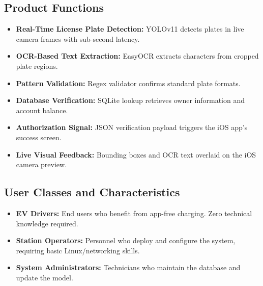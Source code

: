 \subsection{Product Functions}
\begin{itemize}
    \item \textbf{Real-Time License Plate Detection:} YOLOv11 detects plates in live camera frames with sub-second latency.
    \item \textbf{OCR-Based Text Extraction:} EasyOCR extracts characters from cropped plate regions.
    \item \textbf{Pattern Validation:} Regex validator confirms standard plate formats.
    \item \textbf{Database Verification:} SQLite lookup retrieves owner information and account balance.
    \item \textbf{Authorization Signal:} JSON verification payload triggers the iOS app's success screen.
    \item \textbf{Live Visual Feedback:} Bounding boxes and OCR text overlaid on the iOS camera preview.
\end{itemize}

\subsection{User Classes and Characteristics}
\begin{itemize}
    \item \textbf{EV Drivers:} End users who benefit from app-free charging. Zero technical knowledge required.
    \item \textbf{Station Operators:} Personnel who deploy and configure the system, requiring basic Linux/networking skills.
    \item \textbf{System Administrators:} Technicians who maintain the database and update the model.
\end{itemize}

